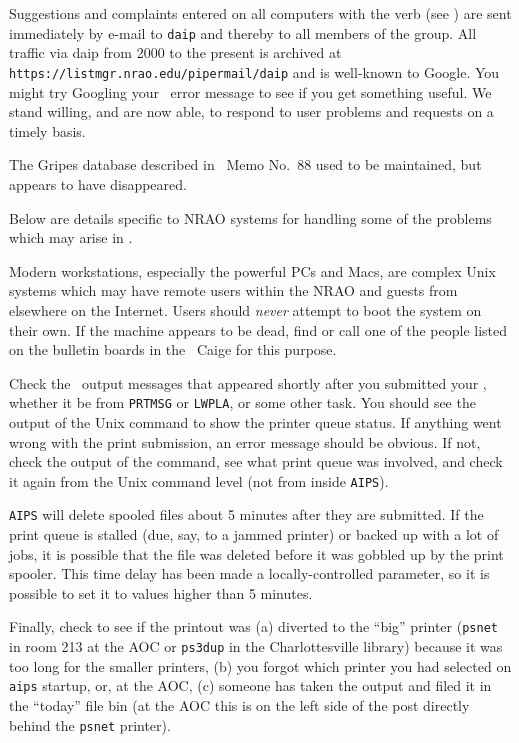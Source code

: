      Suggestions and complaints entered on all computers with the
{\tt {}} verb (see ) are sent immediately by
e-mail to {\tt daip} and thereby to all members of the group.
All traffic via daip from 2000 to the present is archived at {\tt
https://listmgr.nrao.edu/pipermail/daip} and is well-known to Google.
You might try Googling your \AIPS\ error message to see if you get
something useful.  We stand willing, and are now able, to respond to
user problems and requests on a timely basis.

The Gripes database described in \AIPS\ Memo No.~88  used to be
maintained, but appears to have disappeared.

\vfill\eject
{}

     Below are details specific to NRAO systems for handling some of
the problems which may arise in
\hbox{\AIPS}.


     Modern workstations, especially the powerful PCs and Macs, are
complex Unix systems which may have remote users within the NRAO and
guests from elsewhere on the Internet.  Users should {\it never\/}
attempt to boot the system on their own.  If the machine appears to be
dead, find or call one of the people listed on the bulletin boards in
the \AIPS\ Caige for this purpose.


     Check the \AIPS\ output messages that appeared shortly after you
submitted your , whether it be from {\tt PRTMSG} or
{\tt LWPLA}, or some other task.  You should see the output of the
Unix command to show the printer queue status.  If anything went wrong
with the print submission, an error message should be obvious.  If
not, check the output of the {\tt {}} command, see what print
queue was involved, and check it again from the Unix command level
(not from inside {\tt AIPS})\@.

     {\tt AIPS} will delete spooled files about 5 minutes after they
are submitted.  If the print queue is stalled (due, say, to a jammed
printer) or backed up with a lot of jobs, it is possible that the file
was deleted before it was gobbled up by the print spooler.  This time
delay has been made a locally-controlled parameter, so it is possible
to set it to values higher than 5 minutes.

     Finally, check to see if the printout was (a) diverted to the
``big'' printer ({\tt psnet} in room 213 at the AOC or {\tt ps3dup} in
the Charlottesville library) because it was too long for the smaller
printers, (b) you forgot which printer you had selected on {\tt aips}
startup, or, at the AOC, (c) someone has taken the output and filed
it in the ``today'' file bin (at the AOC this is on the left side of
the post directly behind the {\tt psnet} printer).

